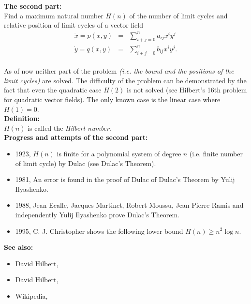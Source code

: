 \documentclass[12pt]{article}
\begin{document}
\textbf{The second part:}\\
Find a maximum natural number $H(n)$ of the number of limit cycles 
and relative position of limit cycles of a vector field
\begin{eqnarray*}\label{sys:pol_deg_n}
\dot{x} = p(x,y) &=&\sum_{i+j=0}^n a_{ij}x^iy^j \\
\dot{y} = q(x,y) &=& \sum_{i+j=0}^n b_{ij}x^iy^j.
\end{eqnarray*}
\cite{DRR}\\

As of now neither part of the problem \textit{(i.e. the bound and the positions of the limit cycles)} are solved.  The difficulty of the problem can be
demonstrated by the fact that even the quadratic case $H(2)$ is not solved (see  Hilbert's 16th problem for quadratic vector fields).  The only known case 
is the linear case where $H(1)=0$.\\

\textbf{Definition:}\\
$H(n)$ is called the \emph{Hilbert number}.\\

\textbf{Progress and attempts of the second part:}
\begin{itemize}
\item 1923, $H(n)$ is finite for a polynomial system of degree $n$ (i.e. finite number of limit cycle) by Dulac \cite{DH} (see Dulac's Theorem).
\item 1981, An error is found in the proof of Dulac of Dulac's Theorem 
by Yulij Ilyashenko.
\item 1988, Jean Ecalle\cite{EJ}, Jacques Martinet, Robert Moussu, Jean Pierre Ramis and independently Yulij Ilyashenko\cite{IY91} prove Dulac's Theorem.
\item 1995, C. J. Christopher shows the following lower bound $H(n)\geq n^2\log n$.\cite{CL}
\end{itemize}

\textbf{See also:}
\begin{itemize}
\item David Hilbert, 
\item David Hilbert, 
\item Wikipedia, 
\end{itemize}
\end{document}
